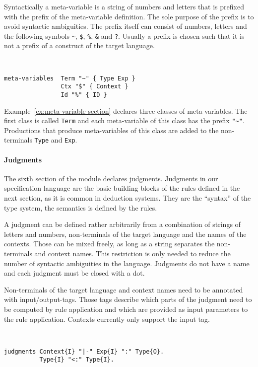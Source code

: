 Syntactically a meta-variable is a string of numbers and letters that
is prefixed with the prefix of the meta-variable definition. The sole
purpose of the prefix is to avoid syntactic ambiguities. The prefix
itself can consist of numbers, letters and the following symbols
\verb|~|, \verb|$|, \verb|%|, \verb|&| and \verb|?|.
 Usually a prefix is chosen such that it
is not a prefix of a construct of the target language.

\begin{example}{~}
\begin{lstlisting}[language=sltc]
meta-variables 	Term "~" { Type Exp }
                Ctx "$" { Context }
                Id "%" { ID }
\end{lstlisting}
\label{ex:meta-variable-section}
\end{example}

Example~\ref{ex:meta-variable-section} declares three classes of
meta-variables. The first class is called \verb|Term| and each
meta-variable of this class has the prefix \verb|"~"|. Productions
that produce meta-variables of this class are added to the
non-terminals \verb|Type| and \verb|Exp|.

\paragraph{Judgments} The sixth section of the module declares
judgments. Judgments in our specification language are the basic
building blocks of the rules defined in the next section, as it is
common in deduction systems. They are the ``syntax'' of the type
system, the semantics is defined by the rules.

A judgment can be defined rather arbitrarily from a combination of
strings of letters and numbers, non-terminals of the target language
and the names of the contexts. Those can be mixed freely, as long as a
string separates the non-terminals and context names. This restriction
is only needed to reduce the number of syntactic ambiguities in the
language. Judgments do not have a name and each judgment must be
closed with a dot.

Non-terminals of the target language and context names need to be
annotated with input/output-tags. Those tags describe which parts of
the judgment need to be computed by rule application and which are
provided as input parameters to the rule application. Contexts
currently only support the input tag.

\begin{example}{~}
\begin{lstlisting}[language=sltc]
judgments Context{I} "|-" Exp{I} ":" Type{O}.
          Type{I} "<:" Type{I}.
\end{lstlisting}
\label{ex:judgment-section}
\end{example}

